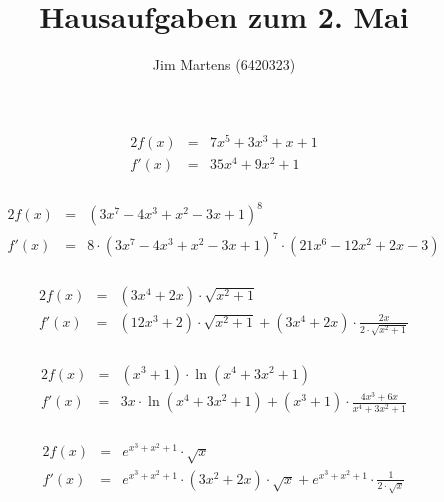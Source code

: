 \documentclass[10pt,a4paper,oneside,ngerman,numbers=noenddot]{scrartcl}
\begin{document}
\author{Jim Martens (6420323)}
\title{Hausaufgaben zum 2. Mai}
\maketitle
\section{} %
\subsection{} %
\subsubsection{} %
\begin{alignat*}{2}
f(x) &=& 7x^{5} + 3x^{3} + x + 1 \\
f'(x) &=& 35x^{4} + 9x^{2} + 1
\end{alignat*}
\subsubsection{} %
\begin{alignat*}{2}
f(x) &=& (3x^{7} - 4x^{3} + x^{2} - 3x + 1)^{8} \\
f'(x) &=& 8 \cdot (3x^{7} - 4x^{3} + x^{2} - 3x + 1)^{7} \cdot (21x^{6} - 12x^{2} + 2x - 3)
\end{alignat*}
\subsubsection{} %
\begin{alignat*}{2}
f(x) &=& (3x^{4} + 2x) \cdot \sqrt{x^{2} + 1} \\
f'(x) &=& (12x^{3} + 2) \cdot \sqrt{x^{2} + 1} + (3x^{4} + 2x) \cdot \frac{2x}{2 \cdot \sqrt{x^{2} + 1}}
\end{alignat*}
\subsubsection{} %
\begin{alignat*}{2}
f(x) &=& (x^{3} + 1) \cdot \ln (x^{4} + 3x^{2} + 1) \\
f'(x) &=& 3x \cdot \ln (x^{4} + 3x^{2} + 1) + (x^{3} + 1) \cdot \frac{4x^{3} + 6x}{x^{4} + 3x^{2} + 1}
\end{alignat*}
\subsubsection{} %
\begin{alignat*}{2}
f(x) &=& e^{x^{3} + x^{2} + 1} \cdot \sqrt{x} \\
f'(x) &=& e^{x^{3} + x^{2} + 1} \cdot (3x^{2} + 2x) \cdot \sqrt{x} + e^{x^{3} + x^{2} + 1} \cdot \frac{1}{2 \cdot \sqrt{x}} 
\end{alignat*}
\end{document}
